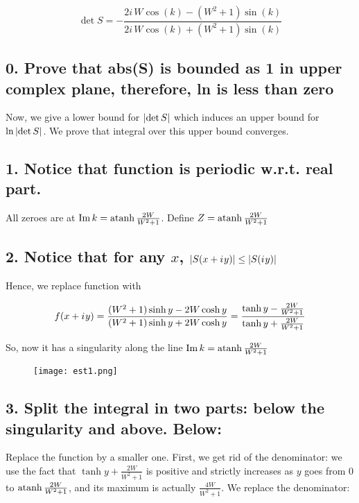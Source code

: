 \[
\det S = - \frac{2 i \, W \cos\left(k\right) - {\left(W^{2} + 1\right)} \sin\left(k\right)}{2 i \, W \cos\left(k\right) + {\left(W^{2} + 1\right)} \sin\left(k\right)}
\]

\subsection*{0. Prove that abs(S) is bounded as 1 in upper complex plane, therefore, ln is less than zero}

Now, we give a lower bound for $\abs{\det S}$ which induces an upper bound for $\ln \abs{\det S}$. We prove that integral over this upper bound converges.

\subsection*{1. Notice that function is periodic w.r.t. real part.}

All zeroes are at $\operatorname{Im} k = \operatorname{atanh} \frac{2 W}{W^2 + 1}$. Define $Z = \operatorname{atanh} \frac{2 W}{W^2 + 1}$


\subsection*{2. Notice that for any $x$, $\abs{S(x + {i\mkern1mu} y)} \le \abs{S({i\mkern1mu} y)}$}

Hence, we replace function with

\[
f(x + {i\mkern1mu} y)
 = \frac{(W^2 + 1) \sinh y - 2 W \cosh y}{(W^2 + 1) \sinh y + 2 W \cosh y}
 = \frac{\tanh y - \frac{2 W}{W^2 + 1}}{\tanh y + \frac{2 W}{W^2 + 1}}
\]

So, now it has a singularity along the line $\operatorname{Im} k = \operatorname{atanh} \frac{2 W}{W^2 + 1}$

\begin{figure}[!htb]
\texttt{[image: est1.png]}
\end{figure}

\subsection*{3. Split the integral in two parts: below the singularity and above. Below:}
Replace the function by a smaller one. First, we get rid of the denominator: we use the fact that $\tanh y + \frac{2 W}{W^2 + 1}$ is positive and strictly increases as $y$ goes from $0$ to $\operatorname{atanh} \frac{2 W}{W^2 + 1}$, and its maximum is actually $\frac{4 W}{W^2 + 1}$. We replace the denominator:

